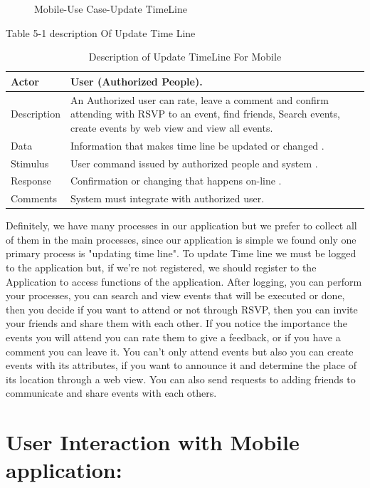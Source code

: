 \documentclass[12pt,a4paper,class,twoside,openany]{report}
\begin{document}
{\begin{figure}
\begin{center}
{}
\caption{Mobile-Use Case-Update TimeLine}
\label{fg:5-1}
\end{center}
\end{figure}
Table 5-1 description Of Update Time Line
\begin{table}
\centering
\begin{tabular}{|l| p{10 cm} |}
\hline
Actor & User (Authorized People). \\ \hline
Description & An Authorized user can rate, leave a comment and confirm attending with RSVP to an event, find friends, Search events, create events by web view and view all events.\\ \hline
Data & Information that makes time line be updated or changed . \\ \hline
Stimulus & User command issued by authorized people and system . \\ \hline
Response & Confirmation or changing that happens on-line . \\ \hline
Comments & System must integrate with authorized user.\\ \hline
\end{tabular}
\caption{ Description of Update TimeLine For Mobile}
\label{tab:table 5-1}
\end{table}
Definitely, we have many processes in our application but we prefer to collect all of them in the main processes, since our application is simple we found only one primary process is "updating time line".
To update Time line we must be logged to the application but, if we're not registered, we should register to the Application to access functions of the application. After logging, you can perform your processes, you can search and view events that will be executed or done, then you decide if you want to attend or not through RSVP, then you can invite your friends and share them with each other. If you notice the importance the events you will attend you can rate them to give a feedback, or if you have a comment you can leave it. You can't only attend events but also you can create events with its attributes, if you want to announce it and determine the place of its location through a web view. You can also send requests to adding friends to communicate and share events with each others.
\section{User Interaction with Mobile application:}
}
\end{document}
